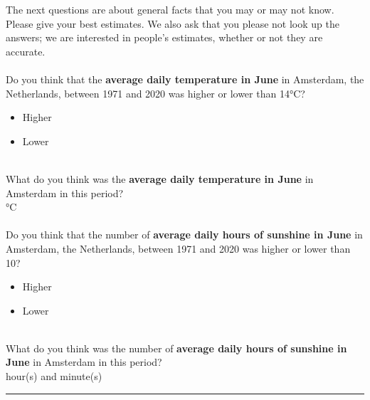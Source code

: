 \documentclass[pdftex,12pt, a4paper]{article}
\begin{document}
\noindent The next questions are about general facts that you may or may not know.
Please give your best estimates.
We also ask that you please not look up the answers; we are interested in people's estimates, whether or not they are accurate.\\
\\
Do you think that the \textbf{average daily temperature in June} in Amsterdam, the Netherlands, between 1971 and 2020 was higher or lower than 14°C?
\begin{itemize}
\item Higher
\item Lower
\end{itemize}
\leavevmode \\
\noindent What do you think was the \textbf{average daily temperature in June} in Amsterdam in this period?\\
\framebox[0.1\textwidth]{\rule{0pt}{15pt}}°C\\
\\
\noindent Do you think that the number of \textbf{average daily hours of sunshine in June} in Amsterdam, the Netherlands, between 1971 and 2020 was higher or lower than 10?
\begin{itemize}
\item Higher
\item Lower
\end{itemize}
\leavevmode \\
\noindent What do you think was the number of \textbf{average daily hours of sunshine in June} in Amsterdam in this period?\\
\framebox[0.1\textwidth]{\rule{0pt}{15pt}} hour(s) and \framebox[0.1\textwidth]{\rule{0pt}{15pt}} minute(s)

\bigskip
\noindent \rule{\linewidth}{0.4pt}
\end{document}
